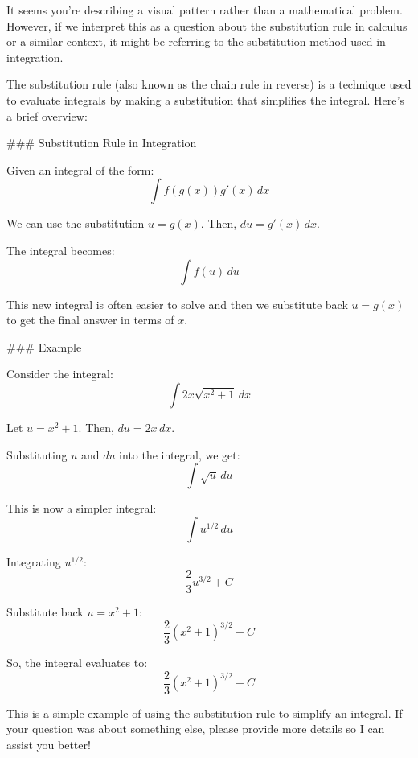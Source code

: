 It seems you're describing a visual pattern rather than a mathematical problem. However, if we interpret this as a question about the substitution rule in calculus or a similar context, it might be referring to the substitution method used in integration.

The substitution rule (also known as the chain rule in reverse) is a technique used to evaluate integrals by making a substitution that simplifies the integral. Here's a brief overview:

### Substitution Rule in Integration

Given an integral of the form:
\[ \int f(g(x)) g'(x) \, dx \]

We can use the substitution \( u = g(x) \). Then, \( du = g'(x) \, dx \).

The integral becomes:
\[ \int f(u) \, du \]

This new integral is often easier to solve and then we substitute back \( u = g(x) \) to get the final answer in terms of \( x \).

### Example

Consider the integral:
\[ \int 2x \sqrt{x^2 + 1} \, dx \]

Let \( u = x^2 + 1 \). Then, \( du = 2x \, dx \).

Substituting \( u \) and \( du \) into the integral, we get:
\[ \int \sqrt{u} \, du \]

This is now a simpler integral:
\[ \int u^{1/2} \, du \]

Integrating \( u^{1/2} \):
\[ \frac{2}{3} u^{3/2} + C \]

Substitute back \( u = x^2 + 1 \):
\[ \frac{2}{3} (x^2 + 1)^{3/2} + C \]

So, the integral evaluates to:
\[ \frac{2}{3} (x^2 + 1)^{3/2} + C \]

This is a simple example of using the substitution rule to simplify an integral. If your question was about something else, please provide more details so I can assist you better!